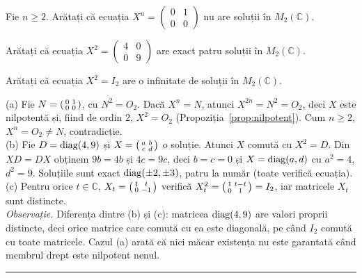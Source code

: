 \begin{parti}
  \item Fie $n\ge2$. Arătați că ecuația $X^n=\begin{pmatrix}0&1\\0&0\end{pmatrix}$ nu are soluții în $M_2(\mathbb{C})$.
  \item Arătați că ecuația $X^2=\begin{pmatrix}4&0\\0&9\end{pmatrix}$ are exact patru soluții în $M_2(\mathbb{C})$.
  \item Arătați că ecuația $X^2=I_2$ are o infinitate de soluții în $M_2(\mathbb{C})$.
\end{parti}
\sol (a) Fie $N=\begin{psmallmatrix}0&1\\0&0\end{psmallmatrix}$, cu $N^2=O_2$. Dacă $X^n=N$, atunci $X^{2n}=N^2=O_2$, deci $X$ este nilpotentă și, fiind de ordin $2$, $X^2=O_2$ (Propoziția~\ref{prop:nilpotent}). Cum $n\ge2$, $X^n=O_2\neq N$, contradicție.\\[2pt]
(b) Fie $D=\operatorname{diag}(4,9)$ și $X=\begin{psmallmatrix}a&b\\c&d\end{psmallmatrix}$ o soluție. Atunci $X$ comută cu $X^2=D$. Din $XD=DX$ obținem $9b=4b$ și $4c=9c$, deci $b=c=0$ și $X=\operatorname{diag}(a,d)$ cu $a^2=4$, $d^2=9$. Soluțiile sunt exact $\operatorname{diag}(\pm2,\pm3)$, patru la număr (toate verifică ecuația).\\[2pt]
(c) Pentru orice $t\in\mathbb{C}$, $X_t=\begin{psmallmatrix}1&t\\0&-1\end{psmallmatrix}$ verifică $X_t^2=\begin{psmallmatrix}1&t-t\\0&1\end{psmallmatrix}=I_2$, iar matricele $X_t$ sunt distincte.\\[2pt]
\emph{Observație.} Diferența dintre (b) și (c): matricea $\operatorname{diag}(4,9)$ are valori proprii distincte, deci orice matrice care comută cu ea este diagonală, pe când $I_2$ comută cu toate matricele. Cazul (a) arată că nici măcar existența nu este garantată când membrul drept este nilpotent nenul.
\vspace{1mm}\hrule

